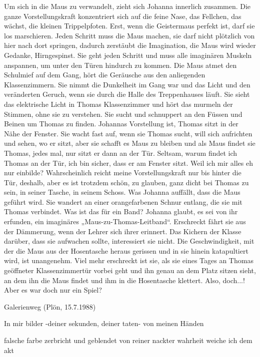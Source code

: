 Um sich in die Maus zu verwandelt, zieht sich Johanna innerlich zusammen. Die ganze Vorstellungskraft konzentriert sich auf die feine Nase, das Fellchen, das wächst, die kleinen Trippelpfoten. Erst, wenn die Geistermaus perfekt ist, darf sie los marschieren. Jeden Schritt muss die Maus machen, sie darf nicht plötzlich von hier nach dort springen, dadurch zerstäubt die Imagination, die Maus wird wieder Gedanke, Hirngespinst. Sie geht jeden Schritt und muss alle imaginären Muskeln anspannen, um unter den Türen hindurch zu kommen. Die Maus atmet den Schulmief auf dem Gang, hört die Geräusche aus den anliegenden Klassenzimmern. Sie nimmt die Dunkelheit im Gang war und das Licht und den veränderten Geruch, wenn sie durch die Halle des Treppenhauses läuft. Sie sieht das elektrische Licht in Thomas Klassenzimmer und hört das murmeln der Stimmen, ohne sie zu verstehen. Sie sucht und schnuppert an den Füssen und Beinen um Thomas zu finden. Johannas Vorstellung ist, Thomas sitzt in der Nähe der Fenster. Sie wacht fast auf, wenn sie Thomas sucht, will sich aufrichten und sehen, wo er sitzt, aber sie schafft es Maus zu bleiben und als Maus findet sie Thomas, jedes mal, nur sitzt er dann an der Tür. Seltsam, warum findet ich Thomas an der Tür, ich bin sicher, dass er am Fenster sitzt. Weil ich mir alles eh nur einbilde? Wahrscheinlich reicht meine Vorstellungskraft nur bis hinter die Tür, deshalb, aber es ist trotzdem schön, zu glauben, ganz dicht bei Thomas zu sein, in seiner Tasche, in seinem Schoss.
Was Johanna auffällt, dass die Maus geführt wird. Sie wandert an einer orangefarbenen Schnur entlang, die sie mit Thomas verbindet. Was ist das für ein Band? Johanna glaubt, es sei von ihr erfunden, ein imaginäres „Maus-zu-Thomas-Leitband“.
Erschreckt fährt sie aus der Dämmerung, wenn der Lehrer sich ihrer erinnert.  Das Kichern der Klasse darüber, dass sie aufwachen sollte, interessiert sie nicht. Die Geschwindigkeit, mit der die Maus aus der Hosentasche heraus gerissen und in sie hinein katapultiert wird, ist unangenehm. 
Viel mehr erschreckt ist sie, als sie eines Tages an Thomas geöffneter Klassenzimmertür vorbei geht und ihn genau an dem Platz sitzen sieht, an dem ihn die Maus findet und ihm in die Hosentasche klettert. Also, doch...! Aber es war doch nur ein Spiel?

Galerienweg (Plön, 15.7.1988)

In mir bilder
-deiner sekunden,
deiner taten-
von meinen Händen

falsche farbe
zerbricht
und 
geblendet
von reiner
nackter
wahrheit
weiche ich
	dem akt

